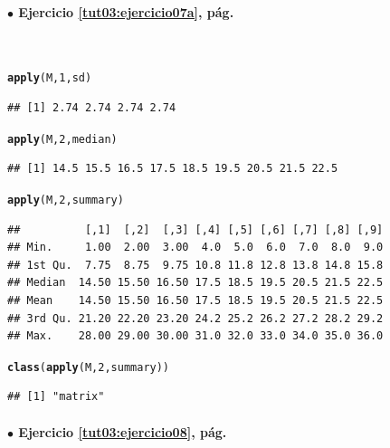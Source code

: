 \documentclass[10pt,a4paper]{article}\usepackage[]{graphicx}\usepackage[]{color}
\makeatletter
\newcommand{\hlnum}[1]{\textcolor[rgb]{0.686,0.059,0.569}{#1}}%
\newcommand{\hlstd}[1]{\textcolor[rgb]{0.345,0.345,0.345}{#1}}%
\newcommand{\hlkwd}[1]{\textcolor[rgb]{0.737,0.353,0.396}{\textbf{#1}}}%
\newenvironment{kframe}{%
 \def\at@end@of@kframe{}%
 \ifinner\ifhmode%
  \def\at@end@of@kframe{\end{minipage}}%
  \begin{minipage}{\columnwidth}%
 \fi\fi%
 \def\FrameCommand##1{\hskip\@totalleftmargin \hskip-\fboxsep
 \colorbox{shadecolor}{##1}\hskip-\fboxsep
     \hskip-\linewidth \hskip-\@totalleftmargin \hskip\columnwidth}%
 \MakeFramed {\advance\hsize-\width
   \@totalleftmargin\z@ \linewidth\hsize
   \@setminipage}}%
 {\par\unskip\endMakeFramed%
 \at@end@of@kframe}
\newenvironment{knitrout}{}{} %
\makeatother
\begin{document}
\paragraph{\bf $\bullet$ Ejercicio \ref{tut03:ejercicio07a}, pág. \pageref{tut03:ejercicio07a}}
\label{tut03:ejercicio07a:sol}\quad\\


\begin{knitrout}
\color{fgcolor}\begin{kframe}
\begin{alltt}
\hlkwd{apply}\hlstd{(M,} \hlnum{1}\hlstd{, sd)}
\end{alltt}
\begin{verbatim}
## [1] 2.74 2.74 2.74 2.74
\end{verbatim}
\begin{alltt}
\hlkwd{apply}\hlstd{(M,} \hlnum{2}\hlstd{, median)}
\end{alltt}
\begin{verbatim}
## [1] 14.5 15.5 16.5 17.5 18.5 19.5 20.5 21.5 22.5
\end{verbatim}
\begin{alltt}
\hlkwd{apply}\hlstd{(M,} \hlnum{2}\hlstd{, summary)}
\end{alltt}
\begin{verbatim}
##          [,1]  [,2]  [,3] [,4] [,5] [,6] [,7] [,8] [,9]
## Min.     1.00  2.00  3.00  4.0  5.0  6.0  7.0  8.0  9.0
## 1st Qu.  7.75  8.75  9.75 10.8 11.8 12.8 13.8 14.8 15.8
## Median  14.50 15.50 16.50 17.5 18.5 19.5 20.5 21.5 22.5
## Mean    14.50 15.50 16.50 17.5 18.5 19.5 20.5 21.5 22.5
## 3rd Qu. 21.20 22.20 23.20 24.2 25.2 26.2 27.2 28.2 29.2
## Max.    28.00 29.00 30.00 31.0 32.0 33.0 34.0 35.0 36.0
\end{verbatim}
\begin{alltt}
\hlkwd{class}\hlstd{(}\hlkwd{apply}\hlstd{(M,} \hlnum{2}\hlstd{, summary))}
\end{alltt}
\begin{verbatim}
## [1] "matrix"
\end{verbatim}
\end{kframe}
\end{knitrout}


\paragraph{\bf $\bullet$ Ejercicio \ref{tut03:ejercicio08}, pág. \pageref{tut03:ejercicio08}}
\label{tut03:ejercicio08:sol}\quad\\
\end{document}
